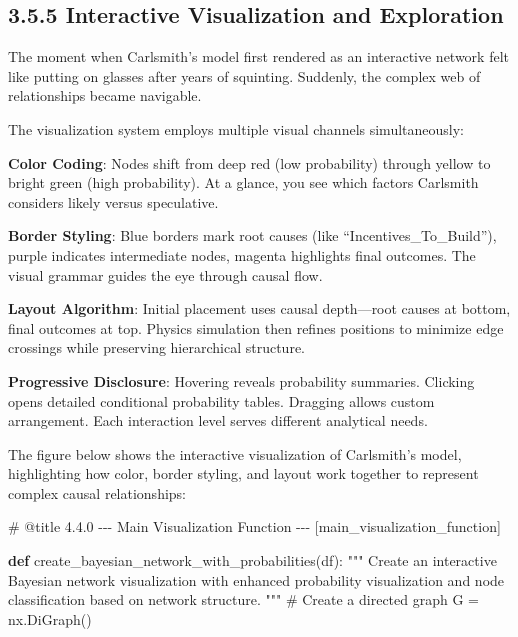 \documentclass[
  11pt,
  letterpaper,
  openany]{book}
\newenvironment{Shaded}{\begin{snugshade}}{\end{snugshade}}
\newcommand{\CommentTok}[1]{\textcolor[rgb]{0.37,0.37,0.37}{#1}}
\newcommand{\KeywordTok}[1]{\textcolor[rgb]{0.00,0.23,0.31}{\textbf{#1}}}
\newcommand{\NormalTok}[1]{\textcolor[rgb]{0.00,0.23,0.31}{#1}}
\newcommand{\OperatorTok}[1]{\textcolor[rgb]{0.37,0.37,0.37}{#1}}
\begin{document}
\begin{landscape}
\subsection{3.5.5 Interactive Visualization and
Exploration}\label{sec-interactive-visualization}

The moment when Carlsmith's model first rendered as an interactive
network felt like putting on glasses after years of squinting. Suddenly,
the complex web of relationships became navigable.

The visualization system employs multiple visual channels
simultaneously:

\textbf{Color Coding}: Nodes shift from deep red (low probability)
through yellow to bright green (high probability). At a glance, you see
which factors Carlsmith considers likely versus speculative.

\textbf{Border Styling}: Blue borders mark root causes (like
``Incentives\_To\_Build''), purple indicates intermediate nodes, magenta
highlights final outcomes. The visual grammar guides the eye through
causal flow.

\textbf{Layout Algorithm}: Initial placement uses causal depth---root
causes at bottom, final outcomes at top. Physics simulation then refines
positions to minimize edge crossings while preserving hierarchical
structure.

\textbf{Progressive Disclosure}: Hovering reveals probability summaries.
Clicking opens detailed conditional probability tables. Dragging allows
custom arrangement. Each interaction level serves different analytical
needs.

The figure below shows the interactive visualization of Carlsmith's
model, highlighting how color, border styling, and layout work together
to represent complex causal relationships:

\label{main_visualization_function}
\begin{Shaded}
\begin{Highlighting}[]
\CommentTok{\# @title 4.4.0 {-}{-}{-} Main Visualization Function {-}{-}{-} [main\_visualization\_function]}

\KeywordTok{def}\NormalTok{ create\_bayesian\_network\_with\_probabilities(df):}
    \CommentTok{"""}
\CommentTok{    Create an interactive Bayesian network visualization with enhanced}
\CommentTok{    probability visualization and node classification based on network structure.}
\CommentTok{    """}
    \CommentTok{\# Create a directed graph}
\NormalTok{    G }\OperatorTok{=}\NormalTok{ nx.DiGraph()}


\end{Highlighting}
\end{Shaded}
\end{landscape}
\end{document}
